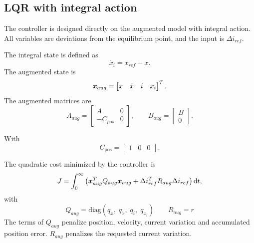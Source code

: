 \subsection{LQR with integral action}

The controller is designed directly on the augmented model with integral action. All variables are
deviations from the equilibrium point, and the input is $\Delta i_{ref}$.

The integral state is defined as
\begin{equation}
    \dot{x_i} = x_{ref} - x.
\end{equation}
The augmented state is
\begin{equation}
    \boldsymbol{x}_{aug} =
    \begin{bmatrix}
         x &  \dot{x} & i & x_i
    \end{bmatrix}^T.
\end{equation}
The augmented matrices are
\begin{equation}
    A_{aug} =
    \begin{bmatrix}
        A & 0 \\
        -C_{pos} & 0
    \end{bmatrix},
    \qquad
    B_{aug} =
    \begin{bmatrix}
        B \\
        0
    \end{bmatrix}.
\end{equation}

With 
\begin{equation}
    C_{\mathrm{pos}}
    =
    \begin{bmatrix}
        1 & 0 & 0
    \end{bmatrix}.
\end{equation}


The quadratic cost minimized by the controller is
\begin{equation}
    J
    =
    \int_0^{\infty}
    \left(
        \boldsymbol{x}_{aug}^T Q_{aug}\boldsymbol{x}_{aug}
        +
        \Delta i_{ref}^T R_{aug}\Delta i_{ref}
    \right)
    \mathrm{d} t,
\end{equation}
with
\begin{equation}
    Q_{aug}
    =
    \mathrm{diag}
    \left(
        q_x,\;
        q_{\dot{x}},\;
        q_i,\;
        q_{x_i}
    \right)
    \qquad
    R_{aug}=r
\end{equation}
The terms of $Q_{aug}$ penalize position, velocity, current variation and accumulated position error.
$R_{aug}$ penalizes the requested current variation.

